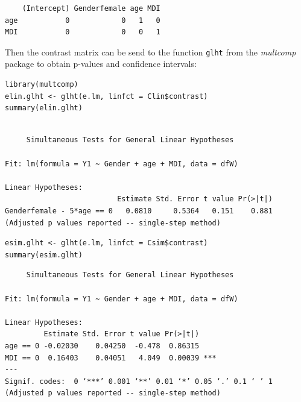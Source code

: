 \documentclass[12pt]{article}
\begin{document}
\begin{verbatim}
    (Intercept) Genderfemale age MDI
age           0            0   1   0
MDI           0            0   0   1
\end{verbatim}

Then the contrast matrix can be send to the function \texttt{glht} from the \emph{multcomp} package to obtain p-values and
confidence intervals:
\lstset{language=r,label= ,caption= ,captionpos=b,numbers=none}
\begin{lstlisting}
library(multcomp)
elin.glht <- glht(e.lm, linfct = Clin$contrast)
summary(elin.glht)
\end{lstlisting}

\begin{verbatim}

	 Simultaneous Tests for General Linear Hypotheses

Fit: lm(formula = Y1 ~ Gender + age + MDI, data = dfW)

Linear Hypotheses:
                          Estimate Std. Error t value Pr(>|t|)
Genderfemale - 5*age == 0   0.0810     0.5364   0.151    0.881
(Adjusted p values reported -- single-step method)
\end{verbatim}

\clearpage

\lstset{language=r,label= ,caption= ,captionpos=b,numbers=none}
\begin{lstlisting}
esim.glht <- glht(e.lm, linfct = Csim$contrast)
summary(esim.glht)
\end{lstlisting}

\begin{verbatim}
	 Simultaneous Tests for General Linear Hypotheses

Fit: lm(formula = Y1 ~ Gender + age + MDI, data = dfW)

Linear Hypotheses:
         Estimate Std. Error t value Pr(>|t|)    
age == 0 -0.02030    0.04250  -0.478  0.86315    
MDI == 0  0.16403    0.04051   4.049  0.00039 ***
---
Signif. codes:  0 ‘***’ 0.001 ‘**’ 0.01 ‘*’ 0.05 ‘.’ 0.1 ‘ ’ 1
(Adjusted p values reported -- single-step method)
\end{verbatim}

\clearpage
\end{document}
